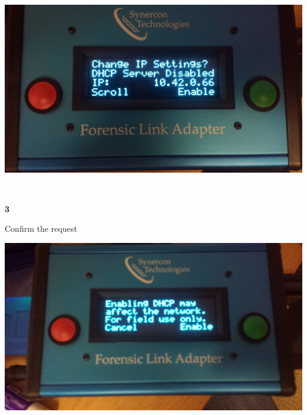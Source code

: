 \documentclass[11pt]{article}
\begin{document}
\hfill%
\begin{minipage}{0.6\textwidth}
\includegraphics[width=\linewidth]{./fla_screens/sys_conf_dhcp_diss}
\end{minipage}
\\[\baselineskip]
\noindent\begin{minipage}{0.3\textwidth}%
\begin{center}
\textbf{3}\\[\baselineskip]
\end{center}
Confirm the request
\end{minipage}%
\hfill%
\begin{minipage}{0.6\textwidth}
\includegraphics[width=\linewidth]{./fla_screens/sys_conf_dhcp_conf_enable}
\end{minipage}
\end{document}
